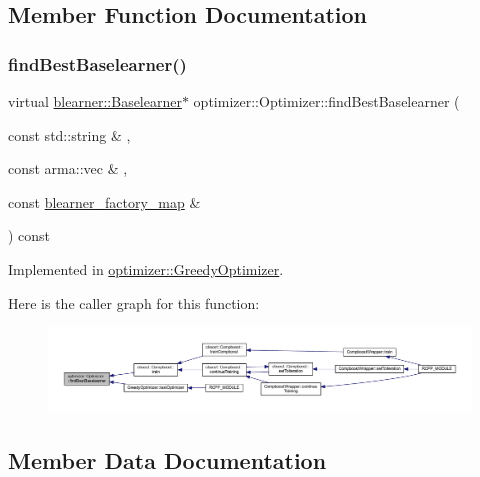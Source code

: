 \subsection{Member Function Documentation}
\mbox{\label{classoptimizer_1_1_optimizer_a134c7b34ed868231fbab53e9ebfa8fd8}} 
\subsubsection{\texorpdfstring{find\+Best\+Baselearner()}{findBestBaselearner()}}
{\footnotesize\ttfamily virtual \mbox{\hyperlink{classblearner_1_1_baselearner}{blearner\+::\+Baselearner}}$\ast$ optimizer\+::\+Optimizer\+::find\+Best\+Baselearner (\begin{DoxyParamCaption}\item[{const std\+::string \&}]{,  }\item[{const arma\+::vec \&}]{,  }\item[{const \mbox{\hyperlink{baselearner__factory__list_8h_a058570e00ae11b882cfed36eb40be025}{blearner\+\_\+factory\+\_\+map}} \&}]{ }\end{DoxyParamCaption}) const\hspace{0.3cm}{\ttfamily [pure virtual]}}



Implemented in \mbox{\hyperlink{classoptimizer_1_1_greedy_optimizer_a5551f9dd7135e3a4acc68ac585be3146}{optimizer\+::\+Greedy\+Optimizer}}.

Here is the caller graph for this function\+:\nopagebreak
\begin{figure}[H]
\begin{center}
\leavevmode
\includegraphics[width=350pt]{classoptimizer_1_1_optimizer_a134c7b34ed868231fbab53e9ebfa8fd8_icgraph}
\end{center}
\end{figure}


\subsection{Member Data Documentation}
\mbox{\label{classoptimizer_1_1_optimizer_a93f8af0ef81986bc208cab5e3cc2ba31}} 

